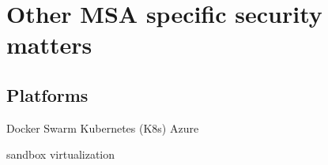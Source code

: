     
















\section{Other MSA specific security matters}
\begin{sloppypar}

\end{sloppypar}

\subsection{Platforms}
\begin{sloppypar}
    Docker Swarm
    Kubernetes (K8s)
    Azure
    
    sandbox
    virtualization 
\end{sloppypar}

